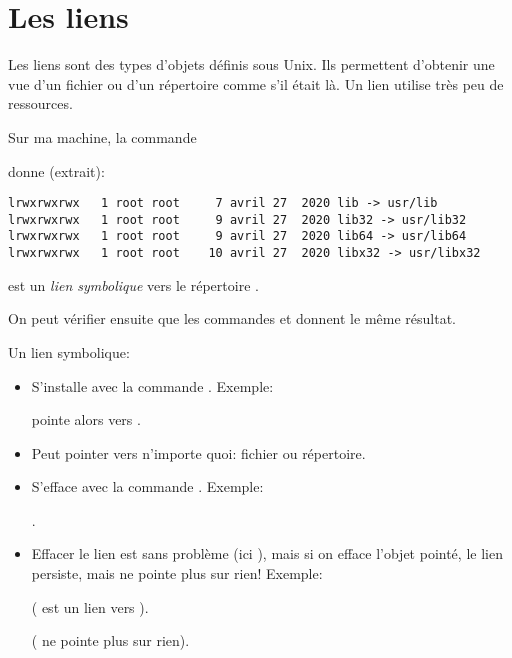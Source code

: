 \section{Les liens}
Les liens sont des types d'objets définis sous Unix. Ils permettent
d'obtenir une vue d'un fichier ou d'un répertoire \og comme s'il était
là\fg. Un lien utilise très peu de ressources.

Sur ma machine, la commande


donne (extrait):

\begin{verbatim}
lrwxrwxrwx   1 root root     7 avril 27  2020 lib -> usr/lib
lrwxrwxrwx   1 root root     9 avril 27  2020 lib32 -> usr/lib32
lrwxrwxrwx   1 root root     9 avril 27  2020 lib64 -> usr/lib64
lrwxrwxrwx   1 root root    10 avril 27  2020 libx32 -> usr/libx32
\end{verbatim}
 est un \emph{lien symbolique} vers le répertoire
  .

  On peut vérifier ensuite que les commandes   et
   donnent le même résultat.

  Un lien symbolique:
  \begin{itemize}
  \item S'installe avec la commande . Exemple:


     pointe alors vers .
  \item Peut pointer vers n'importe quoi: fichier ou répertoire.
  \item S'efface avec la commande . Exemple:

    .
  \item  \textdbend Effacer le lien est sans problème (ici
    ), mais si on efface l'objet pointé, le lien persiste,
    mais ne pointe plus sur rien! Exemple:


     (  est un lien vers ).

     ( ne pointe plus sur rien).

    \begin{center}
    \end{center}
    
  \end{itemize}
      

